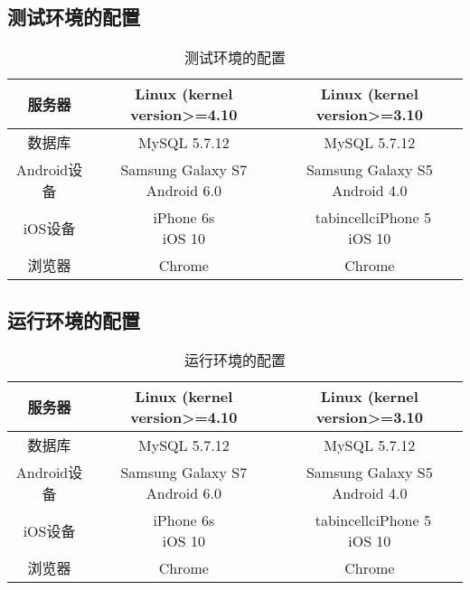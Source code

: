 \subsection{测试环境的配置}
\begin{table}[H]
\centering
\caption{测试环境的配置} \label{tab:test-environment}
\begin{tabular}{|c|c|c|}
    服务器 & Linux (kernel version>=4.10 & Linux (kernel version>=3.10 \\
    \hline
    数据库 & MySQL 5.7.12 & MySQL 5.7.12 \\
    \hline
    Android设备 & \tabincell{c}{Samsung Galaxy S7\\Android 6.0} & \tabincell{c}{Samsung Galaxy S5\\Android 4.0} \\
    \hline
    iOS设备 & \tabincell{c}{iPhone 6s\\iOS 10} &\ tabincell{c}{iPhone 5\\iOS 10}\\
    \hline
    浏览器 & Chrome & Chrome\\
    \hline
\end{tabular}
\end{table}

\subsection{运行环境的配置}
\begin{table}[H]
\centering
\caption{运行环境的配置} \label{tab:operation-environment}
\begin{tabular}{|c|c|c|}
    服务器 & Linux (kernel version>=4.10 & Linux (kernel version>=3.10 \\
    \hline
    数据库 & MySQL 5.7.12 & MySQL 5.7.12 \\
    \hline
    Android设备 & \tabincell{c}{Samsung Galaxy S7\\Android 6.0} & \tabincell{c}{Samsung Galaxy S5\\Android 4.0} \\
    \hline
    iOS设备 & \tabincell{c}{iPhone 6s\\iOS 10} &\ tabincell{c}{iPhone 5\\iOS 10}\\
    \hline
    浏览器 & Chrome & Chrome\\
    \hline
\end{tabular}
\end{table}

